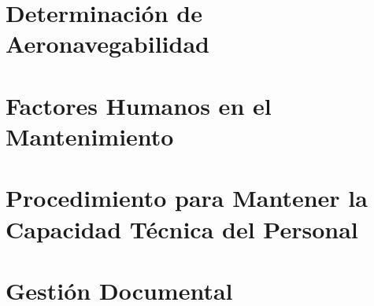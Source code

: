 \documentclass[12pt,openany]{report}
\begin{document}
\chapter{Determinación de Aeronavegabilidad}
\label{inicio_cap14}

\label{fin_cap14}

\chapter{Factores Humanos en el Mantenimiento}
\label{inicio_cap15}

\label{fin_cap15}

\chapter{Procedimiento para Mantener la Capacidad Técnica del Personal}
\label{inicio_cap16}

\label{fin_cap16}

\chapter{Gestión Documental}
\label{inicio_cap17}

\label{fin_cap17}


\label{fin_anexos}
\end{document}
